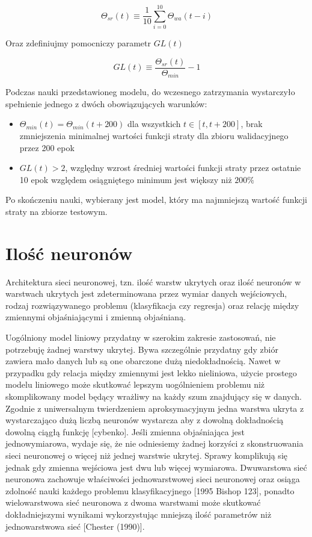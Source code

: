 \documentclass[]{article}
\theoremstyle{definition}
\begin{document}
 $$
 \Theta_{sr}(t) \equiv \frac{1}{10} \sum_{i=0}^{10} \Theta_{wa}(t-i)
 $$
 
 Oraz zdefiniujmy pomocniczy parametr $GL(t)$
 
 
 $$
 GL(t) \equiv \frac{\Theta_{sr}(t)}{\Theta_{min}} - 1
 $$
 
 
 Podczas nauki przedstawioneg modelu, do wczesnego zatrzymania wystarczyło spełnienie jednego z dwóch obowiązujących warunków:

\begin{itemize}
\item $\Theta_{min}(t) = \Theta_{min}(t+ 200)$ dla wszystkich $t \in [t,t+200]$, brak zmniejszenia minimalnej wartości funkcji straty dla zbioru walidacyjnego przez 200 epok 
\item $ GL(t)  > 2$, względny wzrost średniej wartości funkcji straty przez ostatnie 10 epok względem osiągniętego minimum jest większy niż $200\%$
\end{itemize}

Po skończeniu nauki, wybierany jest model, który ma najmniejszą wartość funkcji straty na zbiorze testowym.

\section{Ilość neuronów}

Architektura sieci neuronowej, tzn. ilość warstw ukrytych oraz ilość neuronów w warstwach ukrytych jest zdeterminowana przez wymiar danych wejściowych, rodzaj rozwiązywanego problemu (klasyfikacja czy regresja) oraz relację między zmiennymi objaśniającymi i zmienną objaśnianą.

Uogólniony model liniowy przydatny w szerokim zakresie zastosowań, nie potrzebuję żadnej warstwy ukrytej. Bywa szczególnie przydatny gdy zbiór zawiera mało danych lub są one obarczone dużą niedokładnością. Nawet w przypadku gdy relacja między zmiennymi jest lekko nieliniowa, użycie prostego modelu liniowego może skutkować lepszym uogólnieniem problemu niż skomplikowany model będący wrażliwy na każdy szum znajdujący się w danych. Zgodnie z uniwersalnym twierdzeniem aproksymacyjnym jedna warstwa ukryta z wystarczająco dużą liczbą neuronów wystarcza aby z dowolną dokładnością dowolną ciągłą funkcję [cybenko]. Jeśli zmienna objaśniająca jest jednowymiarowa, wydaje się, że nie odniesiemy żadnej korzyści z skonstruowania sieci neuronowej o więcej niż jednej warstwie ukrytej. Sprawy komplikują się jednak gdy zmienna wejściowa jest dwu lub więcej wymiarowa. Dwuwarstowa sieć neuronowa zachowuje właściwości jednowarstwowej sieci neuronowej oraz osiąga zdolność nauki każdego problemu klasyfikacyjnego [1995 Bishop 123], ponadto wielowarstwowa sieć neuronowa z dwoma warstwami może skutkować dokładniejszymi wynikami wykorzystując mniejszą ilość parametrów niż jednowarstwowa sieć [Chester (1990)].
\end{document}
